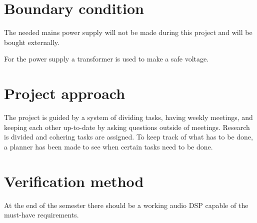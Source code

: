 \section{Boundary condition}

The needed mains power supply will not be made during this project and will be bought externally.

\noindent For the power supply a transformer is used to make a safe voltage.


\section{Project approach}

The project is guided by a system of dividing tasks, having weekly meetings, and keeping each other up-to-date by asking questions outside of meetings. Research is divided and cohering tasks are assigned. To keep track of what has to be done, a planner has been made to see when certain tasks need to be done.

\section{Verification method}

At the end of the semester there should be a working audio DSP capable of the must-have requirements. 

